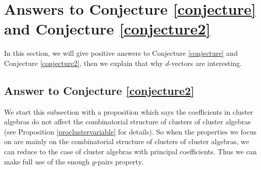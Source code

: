\documentclass[14pt]{amsart}
\begin{document}
\section{ Answers to
 Conjecture \ref{conjecture} and Conjecture \ref{conjecture2}}


In this section, we will give positive answers to Conjecture \ref{conjecture} and Conjecture \ref{conjecture2}, then we explain that why $d$-vectors are interesting.

\subsection{Answer to Conjecture \ref{conjecture2}}

 We start this subsection with a proposition which says the coefficients in cluster algebras do not affect the combinatorial structure of clusters of cluster algebras (see Proposition \ref{proclustervariable} for details). So when the properties we focus on are mainly on the combinatorial structure of clusters of cluster algebras, we can reduce to the case of cluster algebras with principal coefficients. Thus we can make full use of the enough $g$-pairs property.
\end{document}
